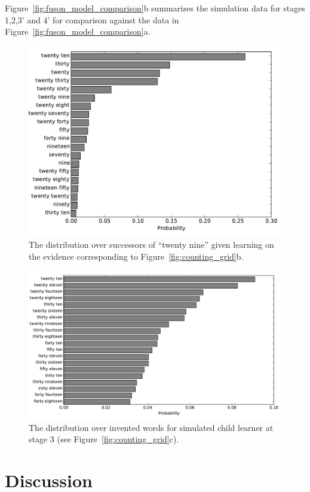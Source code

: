 \documentclass[10pt,letterpaper]{article}
\begin{document}
Figure~\ref{fig:fuson_model_comparison}b summarizes the simulation
data for stages 1,2,3' and 4' for comparison against the
\citet{FusRicBriar1982} data in Figure~\ref{fig:fuson_model_comparison}a.




\begin{figure}[t]
\includegraphics[width=0.9\linewidth]{figures/after29}
\caption{The distribution over successors of ``twenty nine'' given learning on the evidence corresponding to Figure~\ref{fig:counting_grid}b. \label{fig:after29}}
\end{figure}


\begin{figure}[t]
\includegraphics[width=0.9\linewidth]{figures/inventedWords}
\caption{The distribution over invented words for simulated child
  learner at stage
  3 (see Figure~\ref{fig:counting_grid}c). \label{fig:inventedWords}}
\end{figure}


\section{Discussion}
\end{document}
